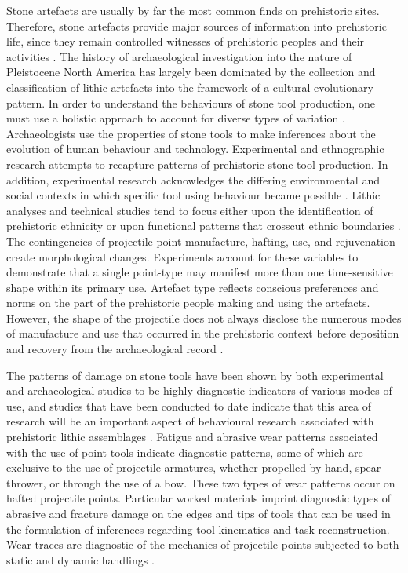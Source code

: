 	
	Stone artefacts are usually by far the most common finds on prehistoric sites. Therefore, stone artefacts provide major sources of information into prehistoric life, since they remain controlled witnesses of prehistoric peoples and their activities \parencite{Cahen_1979}. The history of archaeological investigation into the nature of Pleistocene North America has largely been dominated by the collection and classification of lithic artefacts into the framework of a cultural evolutionary pattern. In order to understand the behaviours of stone tool production, one must use a holistic approach to account for diverse types of variation \parencite{Woods_2011}. Archaeologists use the properties of stone tools to make inferences about the evolution of human behaviour and technology. Experimental and ethnographic research attempts to recapture patterns of prehistoric stone tool production. In addition, experimental research acknowledges the differing environmental and social contexts in which specific tool using behaviour became possible \parencite{Thomas_2011}. Lithic analyses and technical studies tend to focus either upon the identification of prehistoric ethnicity or upon functional patterns that crosscut ethnic boundaries \parencite{Henry_1989}. The contingencies of projectile point manufacture, hafting, use, and rejuvenation create morphological changes. Experiments account for these variables to demonstrate that a single point-type may manifest more than one time-sensitive shape within its primary use. Artefact type reflects conscious preferences and norms on the part of the prehistoric people making and using the artefacts. However, the shape of the projectile does not always disclose the numerous modes of manufacture and use that occurred in the prehistoric context before deposition and recovery from the archaeological record \parencite{Flenniken_1986}. 

	The patterns of damage on stone tools have been shown by both experimental and archaeological studies to be highly diagnostic indicators of various modes of use, and studies that have been conducted to date indicate that this area of research will be an important aspect of behavioural research associated with prehistoric lithic assemblages \parencites{Anderson_2010}{Dockall_1997}. 
Fatigue and abrasive wear patterns associated with the use of point tools indicate diagnostic patterns, some of which are exclusive to the use of projectile armatures, whether propelled by hand, spear thrower, or through the use of a bow. These two types of wear patterns occur on hafted projectile points. Particular worked materials imprint diagnostic types of abrasive and fracture damage on the edges and tips of tools that can be used in the formulation of inferences regarding tool kinematics and task reconstruction. Wear traces are diagnostic of the mechanics of projectile points subjected to both static and dynamic handlings \parencite{Dockall_1997}.
	
